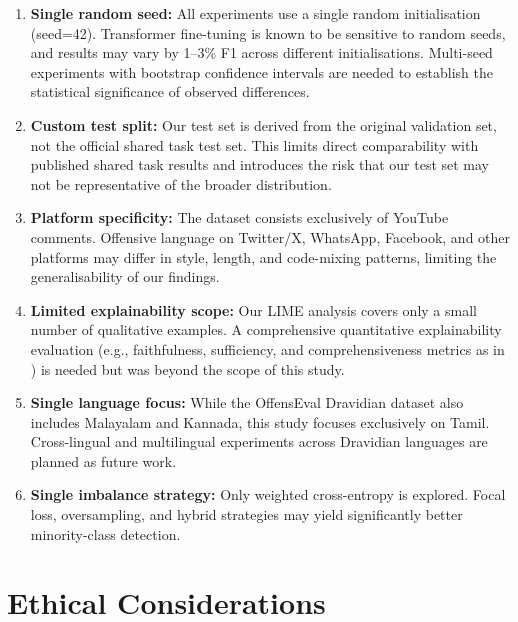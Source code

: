 \documentclass[12pt, a4paper]{article}
\begin{document}
\begin{enumerate}[leftmargin=2em]
    \item \textbf{Single random seed:} All experiments use a single random initialisation (seed=42). Transformer fine-tuning is known to be sensitive to random seeds, and results may vary by 1--3\% F1 across different initialisations. Multi-seed experiments with bootstrap confidence intervals are needed to establish the statistical significance of observed differences.
    
    \item \textbf{Custom test split:} Our test set is derived from the original validation set, not the official shared task test set. This limits direct comparability with published shared task results and introduces the risk that our test set may not be representative of the broader distribution.
    
    \item \textbf{Platform specificity:} The dataset consists exclusively of YouTube comments. Offensive language on Twitter/X, WhatsApp, Facebook, and other platforms may differ in style, length, and code-mixing patterns, limiting the generalisability of our findings.
    
    \item \textbf{Limited explainability scope:} Our LIME analysis covers only a small number of qualitative examples. A comprehensive quantitative explainability evaluation (e.g., faithfulness, sufficiency, and comprehensiveness metrics as in \citet{mathew2021hatexplain}) is needed but was beyond the scope of this study.
    
    \item \textbf{Single language focus:} While the OffensEval Dravidian dataset also includes Malayalam and Kannada, this study focuses exclusively on Tamil. Cross-lingual and multilingual experiments across Dravidian languages are planned as future work.
    
    \item \textbf{Single imbalance strategy:} Only weighted cross-entropy is explored. Focal loss, oversampling, and hybrid strategies may yield significantly better minority-class detection.
\end{enumerate}

\FloatBarrier

\section{Ethical Considerations}
\label{sec:ethics}
\end{document}
